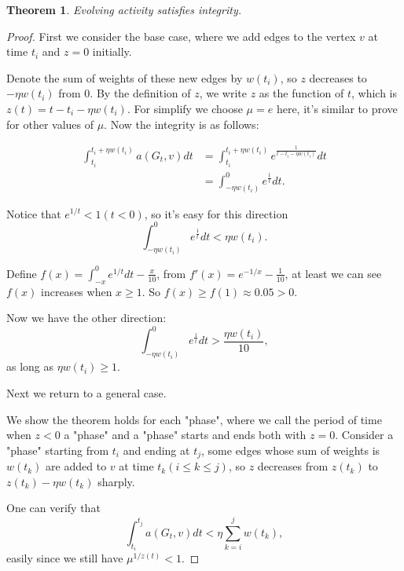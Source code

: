 \documentclass[12pt,abstract=true]{scrartcl}
\numberwithin{equation}{section}
\theoremstyle{definition}   \newtheorem{definition}{Definition}[section]
\theoremstyle{plain}        \newtheorem{theorem}{Theorem}[section]
\theoremstyle{plain}        \newtheorem{observation}{Observation}[section]
\theoremstyle{plain}        \newtheorem{fact}{Fact}[section]
\theoremstyle{plain}        \newtheorem{claim}{Claim}[section]
\theoremstyle{plain}        \newtheorem{lemma}[theorem]{Lemma}
\theoremstyle{plain}        \newtheorem{corollary}[theorem]{Corollary}
\theoremstyle{remark}       \newtheorem{example}{Example}[section]
\theoremstyle{remark}       \newtheorem{remark}{Remark}[section]
\begin{document}
\begin{theorem}
Evolving activity satisfies integrity.
\end{theorem}
\begin{proof}
First we consider the base case, where we add edges to the vertex $v$ at time $t_i$ and $z=0$ initially. 

Denote the sum of weights of these new edges by $w(t_i)$, so $z$ decreases to $-\eta w(t_i)$ from 0. By the definition of $z$, we write $z$ as the function of $t$, which is $z(t)=t-t_i-\eta w(t_i)$. For simplify we choose $\mu=e$ here, it's similar to prove for other values of $\mu$. Now the integrity is as follows:

\begin{equation}
\begin{split}
\int_{t_i}^{t_i+\eta w(t_i)} a(G_t,v) dt &= \int_{t_i}^{t_i+\eta w(t_i)} e^{\frac{1}{t-t_i-\eta w(t_i)}} dt \\
&= \int_{-\eta w(t_i)}^{0} e^{\frac{1}{t}} dt.
\end{split}
\end{equation}

Notice that $e^{1/t}<1(t<0)$, so it's easy for this direction
\begin{equation}
\int_{-\eta w(t_i)}^{0} e^{\frac{1}{t}} dt< \eta w(t_i).
\end{equation}

Define $f(x)=\int_{-x}^{0} e^{1/t} dt - \frac{x}{10}$, from $f'(x)=e^{-1/x}-\frac{1}{10}$, at least we can see $f(x)$ increases when $x\ge 1$. So $f(x)\ge f(1)\approx 0.05>0$.

Now we have the other direction: 
\begin{equation}
\int_{-\eta w(t_i)}^{0} e^{\frac{1}{t}} dt>\frac{\eta w(t_i)}{10},
\end{equation}
as long as $\eta w(t_i)\ge 1$.

Next we return to a general case. 

We show the theorem holds for each "phase", where we call the period of time when $z<0$ a "phase" and a "phase" starts and ends both with $z=0$. Consider a "phase" starting from $t_i$ and ending at $t_j$, some edges whose sum of weights is $w(t_k)$ are added to $v$ at time $t_k(i\le k\le j)$, so $z$ decreases from $z(t_k)$ to $z(t_k)-\eta w(t_k)$ sharply.

One can verify that
\begin{equation}
\int_{t_i}^{t_j} a(G_t,v) dt< \eta \sum_{k=i}^j w(t_k),
\end{equation}
easily since we still have $\mu^{1/z(t)}<1$.


\end{proof}
\end{document}
